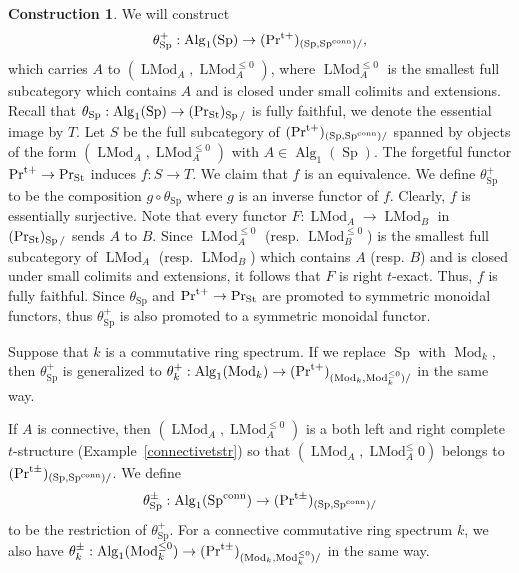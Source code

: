 \documentclass[leqno,12pt]{amsart}
\theoremstyle{plain}
\theoremstyle{definition}
\newtheorem{Construction}[Theorem]{Construction}
\newcommand{\PR}{\textup{Pr}}
\newcommand{\PRTT}{\textup{Pr}^{\textup{t}+}}
\newcommand{\PRTTT}{\textup{Pr}^{\textup{t}\pm}}
\newcommand{\SP}{\operatorname{Sp}}
\newcommand{\SPC}{\operatorname{Sp}^{\textup{conn}}}
\newcommand{\Mod}{\operatorname{Mod}}
\newcommand{\Alg}{\operatorname{Alg}}
\newcommand{\PRST}{\PR_{\textup{St}}}
\newcommand{\LMod}{\operatorname{LMod}}
\begin{document}
\begin{Construction}
\label{tmodule}
We will construct
\[
\theta_{\SP}^{+}:\Alg_{1}(\SP)\to  (\PRTT)_{(\SP,\SPC)/},
\]
which carries $A$ to $(\LMod_A, \LMod_A^{\le0})$,
where $\LMod_A^{\le0}$ is the smallest full subcategory which contains $A$ and is closed under small colimits and extensions.
Recall that
$\theta_{\SP}:\Alg_1(\SP)\to  (\PRST)_{\SP/}$
is fully faithful, we denote the essential image by $T$. Let $S$ be the full subcategory of $(\PRTT)_{(\SP,\SPC)/}$
spanned by objects of the form $(\LMod_A, \LMod_A^{\le0})$ with $A\in\Alg_{1}(\SP)$.
The forgetful functor $\PRTT\to \PRST$ induces $f:S\to T$.
We claim that $f$ is an equivalence. 
We define $\theta_{\SP}^{+}$ to be the composition $g\circ \theta_{\SP}$
where $g$ is an inverse functor of $f$.
Clearly, $f$ is essentially surjective.
Note that every functor $F:\LMod_A\to \LMod_B$ in $(\PRST)_{\SP/}$
sends $A$ to $B$. Since $\LMod_A^{\le0}$ (resp. $\LMod_B^{\le0}$)
is the smallest full subcategory of $\LMod_A$ (resp. $\LMod_B$)
which contains $A$ (resp. $B$) and is closed under small colimits and extensions,
it follows that $F$ is right $t$-exact. Thus, $f$ is fully faithful.
Since $\theta_{\SP}$ and $\PRTT\to \PRST$ are promoted to symmetric monoidal functors,
thus $\theta_{\SP}^+$ is also promoted to a symmetric monoidal functor.

Suppose that $k$ is a commutative ring spectrum.
If we replace $\SP$ with $\Mod_k$, then $\theta_{\SP}^{+}$
is generalized to $\theta_k^+:\Alg_{1}(\Mod_k)\to  (\PRTT)_{(\Mod_k,\Mod_k^{\le0})/}$
in the same way.



If $A$ is connective, then $(\LMod_A,\LMod_A^{\le0})$ is a both left and right complete $t$-structure
(Example~\ref{connectivetstr}) so that $(\LMod_A,\LMod_A^\le0)$ belongs to $(\PRTTT)_{(\SP,\SPC)/}$.
We define
\[
\theta_{\SP}^{\pm}:\Alg_{1}(\SPC)\to  (\PRTTT)_{(\SP,\SPC)/}
\]
to be the restriction of $\theta_{\SP}^+$.
For a connective commutative ring spectrum $k$, we also have $\theta_k^\pm:\Alg_{1}(\Mod_k^{\le0})\to  (\PRTTT)_{(\Mod_k,\Mod_k^{\le0})/}$
in the same way.
\end{Construction}
\end{document}
